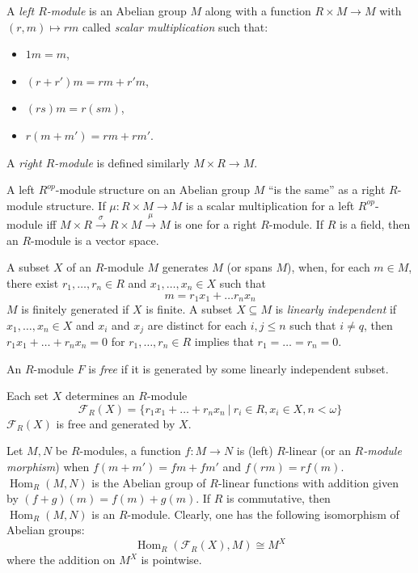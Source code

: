 \documentclass[8pt]{article}
\theoremstyle{definition}
\theoremstyle{definition}
\theoremstyle{definition}
\theoremstyle{definition}
\theoremstyle{definition}
\theoremstyle{definition}
\theoremstyle{definition}
\theoremstyle{definition}
\theoremstyle{definition}
\theoremstyle{definition}
\theoremstyle{definition}
\theoremstyle{definition}
\theoremstyle{definition}
\theoremstyle{definition}
\theoremstyle{question}
\begin{document}
A \emph{left $R$-module} is an Abelian group $M$ along with a function $R \times M \to M$
with $(r, m) \mapsto r m$ called \emph{scalar multiplication} such that:
\begin{itemize}
  \item $1 m = m$,
  \item $(r + r') m = r m + r' m$,
  \item $(r s) m = r (s m)$,
  \item $r (m + m') = r m + rm'$.
\end{itemize}
A \emph{right $R$-module} is defined similarly $M \times R \to M$.

A left $R^{op}$-module structure on an Abelian group $M$ ``is the same'' as a right $R$-module structure.
If $\mu : R \times M \to M$ is a scalar multiplication for a left $R^{op}$-module iff
$M \times R \xrightarrow{\sigma} R \times M \xrightarrow{\mu} M$ is one for a right $R$-module.
If $R$ is a field, then an $R$-module is a vector space.

A subset $X$ of an $R$-module $M$ generates $M$ (or spans $M$), when, for each $m \in M$,
there exist $r_1, \ldots, r_n \in R$ and $x_1, \ldots, x_n \in X$ such that 
\[
m = r_1 x_1 + \ldots r_n x_n
\]
$M$ is finitely generated if $X$ is finite. A subset $X \subseteq M$ is \emph{linearly independent}
if $x_1, \ldots, x_n \in X$ and $x_i$ and $x_j$ are distinct for each $i, j \leq n$ such that $i \neq q$,
then $r_1 x_1 + \ldots + r_n x_n = 0$ for $r_1, \ldots, r_n \in R$ implies that $r_1 = \ldots = r_n = 0$.

An $R$-module $F$ is \emph{free} if it is generated by some linearly independent subset. 

Each set $X$ determines an $R$-module
\[
\mathcal{F}_R(X) = \{ r_1 x_1 + \ldots + r_n x_n \: | \: r_i \in R, x_i \in X, n < \omega \}
\]
$\mathcal{F}_R(X)$ is free and generated by $X$.

Let $M, N$ be $R$-modules, a function $f : M \to N$ is (left) $R$-linear (or an \emph{$R$-module morphism})
when $f(m + m') = fm + fm'$ and $f (r m) = r f(m)$. $\operatorname{Hom}_R(M, N)$ is the Abelian group of 
$R$-linear functions with addition given by $(f + g)(m) = f(m) + g(m)$. If $R$ is commutative, then 
$\operatorname{Hom}_R(M, N)$ is an $R$-module. Clearly, one has the following isomorphism of Abelian groups:
\[
\operatorname{Hom}_R(\mathcal{F}_R(X), M) \cong M^X
\]
where the addition on $M^X$ is pointwise.
\end{document}
